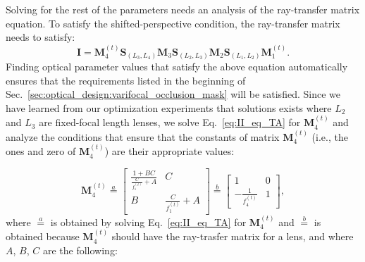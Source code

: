 Solving for the rest of the parameters needs an analysis of the ray-transfer matrix equation. To satisfy the shifted-perspective condition, the ray-transfer matrix needs to satisfy:
\begin{equation}
    \mathbf{I} = \mathbf{M}_4^{(t)} \mathbf{S}_{(L_3,L_4)} \mathbf{M}_3 \mathbf{S}_{(L_2,L_3)} \mathbf{M}_2 \mathbf{S}_{(L_1,L_2)} \mathbf{M}_1^{(t)}.
    \label{eq:II_eq_TA}
\end{equation}
Finding optical parameter values that satisfy the above equation automatically ensures that the requirements listed in the beginning of Sec.~\ref{sec:optical_design:varifocal_occlusion_mask} will be satisfied. Since we have learned from our optimization experiments that solutions exists where $L_2$ and $L_3$ are fixed-focal length lenses, we solve Eq.~\eqref{eq:II_eq_TA} for $\mathbf{M}_4^{(t)}$ and analyze the conditions that ensure that the constants of matrix $\mathbf{M}_4^{(t)}$ (i.e., the ones and zero of $\mathbf{M}_4^{(t)}$) are their appropriate values: 

\begin{equation}
\mathbf{M}_4^{(t)} \overset{a}{=} 
\begin{bmatrix}
\frac{1 + BC}{\frac{C}{f_1^{(t)}} + A} & C \\
B & \frac{C}{f_1^{(t)}} + A
\end{bmatrix}
\overset{b}{=}
\begin{bmatrix}
1 & 0 \\
-\frac{1}{f_4^{(t)}} & 1 
\end{bmatrix},
\label{eq:closed_form_I}
\end{equation}
where $\overset{a}{=}$ is obtained by solving Eq.~\eqref{eq:II_eq_TA} for $\mathbf{M}_4^{(t)}$ and $\overset{b}{=}$  is obtained because $\mathbf{M}_4^{(t)}$ should have the ray-trasfer matrix for a lens, and where $A$, $B$, $C$ are the following:

